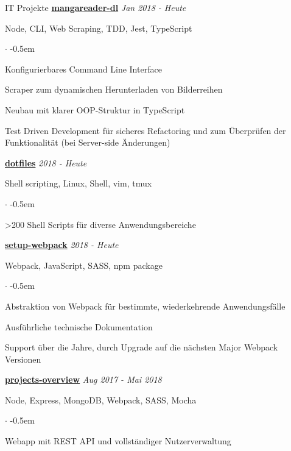 \documentclass{cv}
\begin{document}
\begin{rSection}{IT Projekte}
  \textbf{\href{https://github.com/jneidel/mangareader-dl}{mangareader-dl}}
  \hfill
  {\em Jan 2018 - Heute}

  Node, CLI, Web Scraping, TDD, Jest, TypeScript
  \begin{list}{$\cdot$}{}
    \itemsep -0.5em \vspace{-0.5em}
    \smallskip
    \item Konfigurierbares Command Line Interface
    \item Scraper zum dynamischen Herunterladen von Bilderreihen
    \item Neubau mit klarer OOP-Struktur in TypeScript
    \item Test Driven Development für sicheres Refactoring und zum Überprüfen der
  Funktionalität (bei Server-side Änderungen)
  \end{list}

  \textbf{\href{https://github.com/jneidel/dotfiles}{dotfiles}}
  \hfill
  {\em 2018 - Heute}

  Shell scripting, Linux, Shell, vim, tmux
  \begin{list}{$\cdot$}{}
    \itemsep -0.5em \vspace{-0.5em}
    \smallskip
    \item \textgreater200 Shell Scripts für diverse Anwendungsbereiche
  \end{list}

  \textbf{\href{https://github.com/jneidel/setup-webpack}{setup-webpack}}
  \hfill
  {\em 2018 - Heute}

  Webpack, JavaScript, SASS, npm package
  \begin{list}{$\cdot$}{}
    \itemsep -0.5em \vspace{-0.5em}
    \smallskip
    \item Abstraktion von Webpack für bestimmte, wiederkehrende Anwendungsfälle
    \item Ausführliche technische Dokumentation
    \item Support über die Jahre, durch Upgrade auf die nächsten Major Webpack Versionen
  \end{list}

  \textbf{\href{https://github.com/jneidel/projects-overview}{projects-overview}}
  \hfill
  {\em Aug 2017 - Mai 2018}

  Node, Express, MongoDB, Webpack, SASS, Mocha
  \begin{list}{$\cdot$}{}
    \itemsep -0.5em \vspace{-0.5em}
    \smallskip
    \item Webapp mit REST API und vollständiger Nutzerverwaltung
  \end{list}



\end{rSection}
\end{document}
